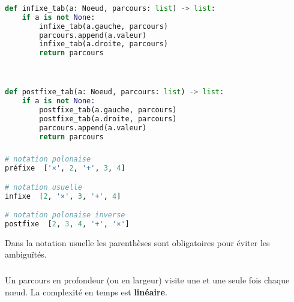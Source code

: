 \documentclass[svgnames,11pt]{beamer}
\begin{document}
\begin{frame}[fragile]
    \frametitle{}

\begin{center}
\begin{lstlisting}[language=Python , basicstyle=\ttfamily\small, xleftmargin=.5em, xrightmargin=0em]
def infixe_tab(a: Noeud, parcours: list) -> list:
    if a is not None:
        infixe_tab(a.gauche, parcours)        
        parcours.append(a.valeur)
        infixe_tab(a.droite, parcours)
        return parcours



def postfixe_tab(a: Noeud, parcours: list) -> list:
    if a is not None:
        postfixe_tab(a.gauche, parcours)        
        postfixe_tab(a.droite, parcours)
        parcours.append(a.valeur)
        return parcours
\end{lstlisting}
\end{center}

\end{frame}
\begin{frame}[fragile]
    \frametitle{}

\begin{center}
\begin{lstlisting}[language=Python , basicstyle=\ttfamily\small, xleftmargin=1em, xrightmargin=1em]
# notation polonaise
préfixe  ['×', 2, '+', 3, 4]

# notation usuelle
infixe  [2, '×', 3, '+', 4]

# notation polonaise inverse
postfixe  [2, 3, 4, '+', '×']
\end{lstlisting}
\end{center}
\begin{aretenir}[Remarque]
Dans la notation usuelle les parenthèses sont obligatoires pour éviter les ambiguïtés.
\end{aretenir}
\end{frame}
\begin{frame}
    \frametitle{}

    \begin{aretenir}[]
Un parcours en profondeur (ou en largeur) visite une et une seule fois chaque nœud. La complexité en temps est \textbf{linéaire}.
    \end{aretenir}

\end{frame}
\end{document}
